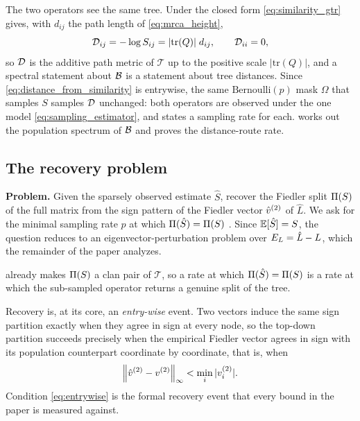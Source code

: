 The two operators see the same tree. Under  the closed form
\eqref{eq:similarity_gtr} gives, with $d_{ij}$ the path length of
\eqref{eq:mrca_height},
\begin{equation}\label{eq:distance_from_similarity}
   \mathcal{D}_{ij} = -\log S_{ij} = |\mathrm{tr}(Q)|\;d_{ij},
   \qquad \mathcal{D}_{ii}=0,
\end{equation}
so $\mathcal{D}$ is the additive path metric of $\mathcal{T}$ up to the positive scale
$|\mathrm{tr}(Q)|$, and a spectral statement about $\mathcal{B}$ is a statement about tree
distances. Since \eqref{eq:distance_from_similarity} is entrywise, the same
$\mathrm{Bernoulli}(p)$ mask $\Omega$ that samples $S$ samples $\mathcal{D}$ unchanged:
both operators are observed under the one model \eqref{eq:sampling_estimator}, and
 states a sampling rate for each.  works out the
population spectrum of $\mathcal{B}$ and proves the distance-route rate.


\subsection{The recovery problem}\label{sec:problem-statement}

\medskip
\noindent\textbf{Problem.} Given the sparsely observed estimate $\hat S$, recover the
Fiedler split $\Pi(S)$ of the full matrix from the sign pattern of the Fiedler vector
$\hat v^{(2)}$ of $\hat L$. We ask for the minimal sampling rate $p$ at which
$\Pi(\hat S)=\Pi(S)$ \hp. Since $\mathbb{E}[\hat S]=S$, the question reduces to an
eigenvector-perturbation problem over $E_{L}=\hat L-L$, which the remainder of the
paper analyzes.

 already makes $\Pi(S)$ a clan pair of $\mathcal{T}$, so a rate
at which $\Pi(\hat S)=\Pi(S)$ is a rate at which the sub-sampled operator returns a
genuine split of the tree. 


\medskip
Recovery is, at its core, an \emph{entry-wise} event. Two vectors induce the same
sign partition exactly when they agree in sign at every node, so the top-down
partition succeeds precisely when the empirical Fiedler vector agrees in sign with
its population counterpart coordinate by coordinate, that is, when
\begin{equation}\label{eq:entrywise}
   \left\lVert \hat v^{(2)}-v^{(2)} \right\rVert_\infty<\min_i|v^{(2)}_i|.
\end{equation}
Condition \eqref{eq:entrywise} is the formal recovery event that every bound in
the paper is measured against.
